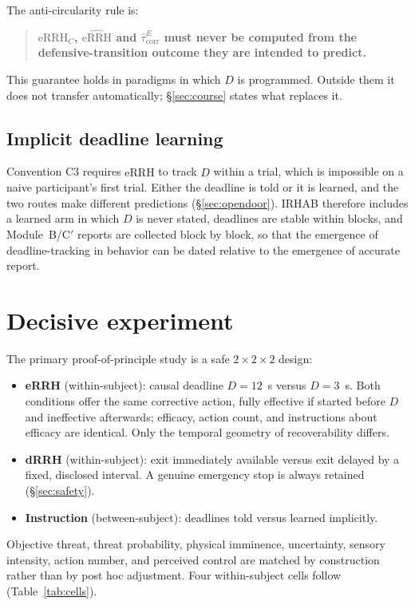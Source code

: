 \documentclass[9pt,twocolumn]{article}
\newcommand{\eRRHc}{\mathrm{eRRH}_{C}}
\newcommand{\eRRHhat}{\widehat{\mathrm{eRRH}}}
\newcommand{\tcorr}{\widehat{\tau}^{E}_{\mathrm{corr}}}
\begin{document}
The anti-circularity rule is:
\begin{quote}
\textbf{$\eRRHc$, $\eRRHhat$ and $\tcorr$ must never be computed from the defensive-transition outcome they are intended to predict.}
\end{quote}
This guarantee holds in paradigms in which $D$ is programmed. Outside them it does not transfer automatically; \S\ref{sec:course} states what replaces it.

\subsection{Implicit deadline learning}
Convention C3 requires $\eRRHhat$ to track $D$ within a trial, which is impossible on a naive participant's first trial. Either the deadline is told or it is learned, and the two routes make different predictions (\S\ref{sec:opendoor}). IRHAB therefore includes a learned arm in which $D$ is never stated, deadlines are stable within blocks, and Module~B/C$'$ reports are collected block by block, so that the emergence of deadline-tracking in behavior can be dated relative to the emergence of accurate report.

\section{Decisive experiment}
\label{sec:decisive}
The primary proof-of-principle study is a safe $2\times2\times2$ design:
\begin{itemize}
\item \textbf{eRRH} (within-subject): causal deadline $D=12$~s versus $D=3$~s. Both conditions offer the same corrective action, fully effective if started before $D$ and ineffective afterwards; efficacy, action count, and instructions about efficacy are identical. Only the temporal geometry of recoverability differs.
\item \textbf{dRRH} (within-subject): exit immediately available versus exit delayed by a fixed, disclosed interval. A genuine emergency stop is always retained (\S\ref{sec:safety}).
\item \textbf{Instruction} (between-subject): deadlines told versus learned implicitly.
\end{itemize}
Objective threat, threat probability, physical imminence, uncertainty, sensory intensity, action number, and perceived control are matched by construction rather than by post hoc adjustment. Four within-subject cells follow (Table~\ref{tab:cells}).
\end{document}
